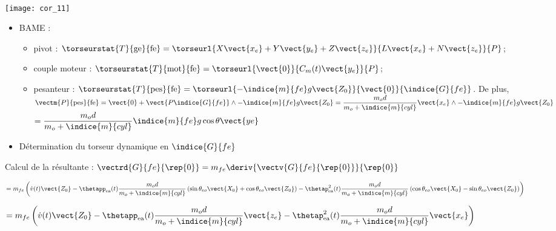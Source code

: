 \question{}
\ifprof
\begin{corrige} ~\\
\begin{minipage}[c]{.35\linewidth}
\begin{center}
\texttt{[image: cor\_11]}
\end{center}
\end{minipage}\hfill
\begin{minipage}[c]{.6\linewidth}
\begin{itemize}
\item BAME : 
\begin{itemize}
\item pivot : $\torseurstat{T}{\text{ge}}{\text{fe}} = \torseurl{X\vect{x_e}+Y\vect{y_e}+Z\vect{z_e}}{L\vect{x_e}+N\vect{z_e}}{P}$;
\item couple moteur : $\torseurstat{T}{\text{mot}}{\text{fe}} = \torseurl{\vect{0}}{C_m(t)\vect{y_e}}{P}$;
\item pesanteur : $\torseurstat{T}{\text{pes}}{\text{fe}} = \torseurl{-\indice{m}{fe}g\vect{Z_0}}{\vect{0}}{\indice{G}{fe}}$. De plus, 
$\vectm{P}{\text{pes}}{\text{fe}} = \vect{0} + \vect{P\indice{G}{fe}}\wedge -\indice{m}{fe}g\vect{Z_0} =  \dfrac{m_od}{m_o+\indice{m}{cyl}}\vect{x_e} \wedge -\indice{m}{fe}g\vect{Z_0} $  $= \dfrac{m_od}{m_o+\indice{m}{cyl}}\indice{m}{fe}g\cos\theta \vect{ye} $
\end{itemize}
\end{itemize}
\end{minipage}

\begin{itemize}
\item Détermination du torseur dynamique en $\indice{G}{fe}$
\end{itemize}

Calcul de la résultante : $\vectrd{G}{fe}{\rep{0}} =m_{fe}\deriv{\vectv{G}{fe}{\rep{0}}}{\rep{0}}$ 

$ = m_{fe}\left(
 \dot{v}(t)\vect{Z_0}
-\thetapp_{\text{ea}}(t) \dfrac{m_o d}{m_o+\indice{m}{cyl}} \left(\sin\theta_{eo}\vect{X_0}+\cos\theta_{eo}\vect{Z_0} \right)
-\thetap^2_{\text{ea}}(t) \dfrac{m_o d}{m_o+\indice{m}{cyl}} \left(\cos\theta_{eo}\vect{X_0}-\sin\theta_{eo}\vect{Z_0} \right)\right)$ 


$ = m_{fe}\left(
 \dot{v}(t)\vect{Z_0}
-\thetapp_{\text{ea}}(t) \dfrac{m_o d}{m_o+\indice{m}{cyl}}\vect{z_e}
-\thetap^2_{\text{ea}}(t) \dfrac{m_o d}{m_o+\indice{m}{cyl}}\vect{x_e}\right)
$ 




\end{corrige}
